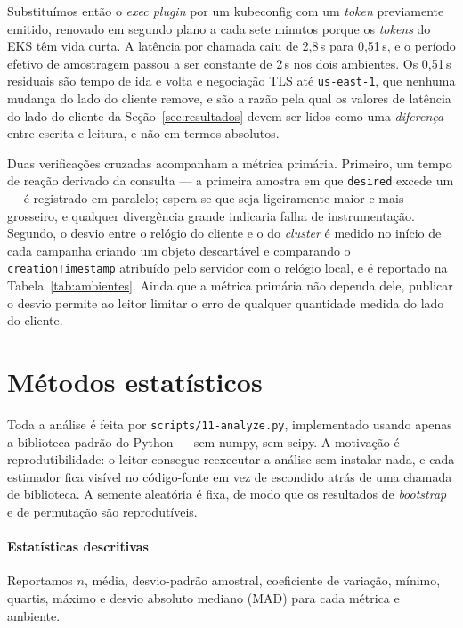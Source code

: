 \documentclass[conference]{IEEEtran}
\begin{document}
Substituímos então o \emph{exec plugin} por um kubeconfig com um \emph{token}
previamente emitido, renovado em segundo plano a cada sete minutos porque os
\emph{tokens} do EKS têm vida curta. A latência por chamada caiu de 2,8\,s para
0,51\,s, e o período efetivo de amostragem passou a ser constante de 2\,s nos
dois ambientes. Os 0,51\,s residuais são tempo de ida e volta e negociação TLS
até \texttt{us-east-1}, que nenhuma mudança do lado do cliente remove, e são a
razão pela qual os valores de latência do lado do cliente da
Seção~\ref{sec:resultados} devem ser lidos como uma \emph{diferença} entre
escrita e leitura, e não em termos absolutos.

Duas verificações cruzadas acompanham a métrica primária. Primeiro, um tempo de
reação derivado da consulta --- a primeira amostra em que \texttt{desired} excede
um --- é registrado em paralelo; espera-se que seja ligeiramente maior e mais
grosseiro, e qualquer divergência grande indicaria falha de instrumentação.
Segundo, o desvio entre o relógio do cliente e o do \emph{cluster} é medido no
início de cada campanha criando um objeto descartável e comparando o
\texttt{creationTimestamp} atribuído pelo servidor com o relógio local, e é
reportado na Tabela~\ref{tab:ambientes}. Ainda que a métrica primária não dependa
dele, publicar o desvio permite ao leitor limitar o erro de qualquer quantidade
medida do lado do cliente.

\section{Métodos estatísticos}
\label{sec:estatistica}

Toda a análise é feita por \texttt{scripts/11-analyze.py}, implementado usando
apenas a biblioteca padrão do Python --- sem numpy, sem scipy. A motivação é
reprodutibilidade: o leitor consegue reexecutar a análise sem instalar nada, e
cada estimador fica visível no código-fonte em vez de escondido atrás de uma
chamada de biblioteca. A semente aleatória é fixa, de modo que os resultados de
\emph{bootstrap} e de permutação são reprodutíveis.

\paragraph{Estatísticas descritivas} Reportamos $n$, média, desvio-padrão
amostral, coeficiente de variação, mínimo, quartis, máximo e desvio absoluto
mediano (MAD) para cada métrica e ambiente.
\end{document}

